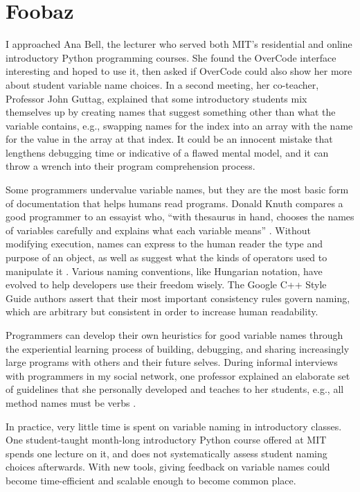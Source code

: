 \section{Foobaz}

I approached Ana Bell, the lecturer who served both MIT's residential and online introductory Python programming courses. She found the OverCode interface interesting and hoped to use it, then asked if OverCode could also show her more about student variable name choices. In a second meeting, her co-teacher, Professor John Guttag, explained that some introductory students mix themselves up by creating names that suggest something other than what the variable contains, e.g., swapping names for the index into an array with the name for the value in the array at that index. It could be an innocent mistake that lengthens debugging time or indicative of a flawed mental model, and it can throw a wrench into their program comprehension process. 

Some programmers undervalue variable names, but they are the most basic form of documentation that helps humans read programs. Donald Knuth compares a good programmer to an essayist who, ``with thesaurus in hand, chooses the names of variables carefully and explains what each variable means'' \cite{literateprogramming}. Without modifying execution, names can express to the human reader the type and purpose of an object, as well as suggest what the kinds of operators used to manipulate it \cite{operands}. Various naming conventions, like Hungarian notation, have evolved to help developers use their freedom wisely. The Google C++ Style Guide authors assert that their most important consistency rules govern naming, which are arbitrary but consistent in order to increase human readability. 

Programmers can develop their own heuristics for good variable names through the experiential learning process of building, debugging, and sharing increasingly large programs with others and their future selves. During informal interviews with programmers in my social network, one professor explained an elaborate set of guidelines that she personally developed and teaches to her students, e.g., all method names must be verbs \cite{doshiconversation}.

In practice, very little time is spent on variable naming in introductory classes. One student-taught month-long introductory Python course offered at MIT spends one lecture on it, and does not systematically assess student naming choices afterwards. With new tools, giving feedback on variable names could become time-efficient and scalable enough to become common place. 

